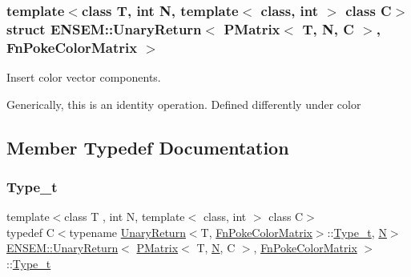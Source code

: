\subsubsection*{template$<$class T, int N, template$<$ class, int $>$ class C$>$\newline
struct E\+N\+S\+E\+M\+::\+Unary\+Return$<$ P\+Matrix$<$ T, N, C $>$, Fn\+Poke\+Color\+Matrix $>$}

Insert color vector components. 

Generically, this is an identity operation. Defined differently under color 

\subsection{Member Typedef Documentation}
\mbox{\label{structENSEM_1_1UnaryReturn_3_01PMatrix_3_01T_00_01N_00_01C_01_4_00_01FnPokeColorMatrix_01_4_a6a760e5a25e755f512b069ab1aee8a4d}} 
\subsubsection{\texorpdfstring{Type\_t}{Type\_t}\hspace{0.1cm}{\footnotesize\ttfamily [1/2]}}
{\footnotesize\ttfamily template$<$class T , int N, template$<$ class, int $>$ class C$>$ \\
typedef C$<$typename \mbox{\hyperlink{structENSEM_1_1UnaryReturn}{Unary\+Return}}$<$T, \mbox{\hyperlink{structENSEM_1_1FnPokeColorMatrix}{Fn\+Poke\+Color\+Matrix}}$>$\+::\mbox{\hyperlink{structENSEM_1_1UnaryReturn_3_01PMatrix_3_01T_00_01N_00_01C_01_4_00_01FnPokeColorMatrix_01_4_a6a760e5a25e755f512b069ab1aee8a4d}{Type\+\_\+t}}, \mbox{\hyperlink{operator__name__util_8cc_a7722c8ecbb62d99aee7ce68b1752f337}{N}}$>$ \mbox{\hyperlink{structENSEM_1_1UnaryReturn}{E\+N\+S\+E\+M\+::\+Unary\+Return}}$<$ \mbox{\hyperlink{classENSEM_1_1PMatrix}{P\+Matrix}}$<$ T, \mbox{\hyperlink{operator__name__util_8cc_a7722c8ecbb62d99aee7ce68b1752f337}{N}}, C $>$, \mbox{\hyperlink{structENSEM_1_1FnPokeColorMatrix}{Fn\+Poke\+Color\+Matrix}} $>$\+::\mbox{\hyperlink{structENSEM_1_1UnaryReturn_3_01PMatrix_3_01T_00_01N_00_01C_01_4_00_01FnPokeColorMatrix_01_4_a6a760e5a25e755f512b069ab1aee8a4d}{Type\+\_\+t}}}

